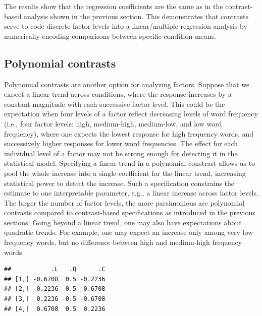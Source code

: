 \documentclass[12pt,]{krantz}
\newenvironment{Shaded}{\begin{snugshade}}{\end{snugshade}}
\newcommand{\DecValTok}[1]{\textcolor[rgb]{0.00,0.00,0.81}{#1}}
\newcommand{\KeywordTok}[1]{\textcolor[rgb]{0.13,0.29,0.53}{\textbf{#1}}}
\newcommand{\NormalTok}[1]{#1}
\newcommand{\OperatorTok}[1]{\textcolor[rgb]{0.81,0.36,0.00}{\textbf{#1}}}
\newcommand{\StringTok}[1]{\textcolor[rgb]{0.31,0.60,0.02}{#1}}
\begin{document}
The results show that the regression coefficients are the same as in the contrast-based analysis shown in the previous section. This demonstrates that contrasts serve to code discrete factor levels into a linear/multiple regression analysis by numerically encoding comparisons between specific condition means.

\hypertarget{polynomialContrasts}{%
\subsection{Polynomial contrasts}\label{polynomialContrasts}}

Polynomial contrasts are another option for analyzing factors. Suppose that we expect a linear trend across conditions, where the response increases by a constant magnitude with each successive factor level. This could be the expectation when four levels of a factor reflect decreasing levels of word frequency (i.e., four factor levels: high, medium-high, medium-low, and low word frequency), where one expects the lowest response for high frequency words, and successively higher responses for lower word frequencies. The effect for each individual level of a factor may not be strong enough for detecting it in the statistical model. Specifying a linear trend in a polynomial constrast allows us to pool the whole increase into a single coefficient for the linear trend, increasing statistical power to detect the increase. Such a specification constrains the estimate to one interpretable parameter, e.g., a linear increase across factor levels. The larger the number of factor levels, the more parsimonious are polynomial contrasts compared to contrast-based specifications as introduced in the previous sections. Going beyond a linear trend, one may also have expectations about quadratic trends. For example, one may expect an increase only among very low frequency words, but no difference between high and medium-high frequency words.

\begin{Shaded}
\end{Shaded}

\begin{verbatim}
##           .L   .Q      .C
## [1,] -0.6708  0.5 -0.2236
## [2,] -0.2236 -0.5  0.6708
## [3,]  0.2236 -0.5 -0.6708
## [4,]  0.6708  0.5  0.2236
\end{verbatim}
\end{document}
